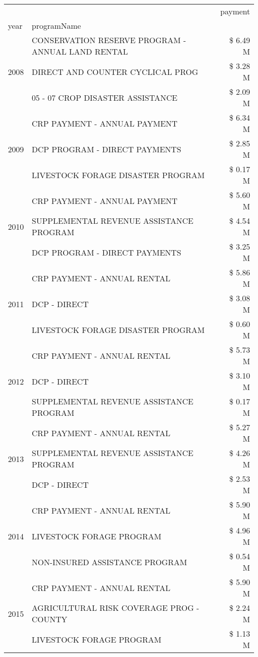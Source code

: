 \begin{tabular}{llr}
\toprule
 &  & payment \\
year & programName &  \\
\midrule
\multirow[t]{3}{*}{2008} & CONSERVATION RESERVE PROGRAM - ANNUAL LAND RENTAL & \$ 6.49 M \\
 & DIRECT AND COUNTER CYCLICAL PROG & \$ 3.28 M \\
 & 05 - 07 CROP DISASTER ASSISTANCE & \$ 2.09 M \\
\cline{1-3}
\multirow[t]{3}{*}{2009} & CRP PAYMENT - ANNUAL PAYMENT & \$ 6.34 M \\
 & DCP PROGRAM - DIRECT PAYMENTS & \$ 2.85 M \\
 & LIVESTOCK FORAGE DISASTER  PROGRAM & \$ 0.17 M \\
\cline{1-3}
\multirow[t]{3}{*}{2010} & CRP PAYMENT - ANNUAL PAYMENT & \$ 5.60 M \\
 & SUPPLEMENTAL REVENUE ASSISTANCE PROGRAM & \$ 4.54 M \\
 & DCP PROGRAM - DIRECT PAYMENTS & \$ 3.25 M \\
\cline{1-3}
\multirow[t]{3}{*}{2011} & CRP PAYMENT - ANNUAL RENTAL & \$ 5.86 M \\
 & DCP - DIRECT & \$ 3.08 M \\
 & LIVESTOCK FORAGE DISASTER PROGRAM & \$ 0.60 M \\
\cline{1-3}
\multirow[t]{3}{*}{2012} & CRP PAYMENT - ANNUAL RENTAL & \$ 5.73 M \\
 & DCP - DIRECT & \$ 3.10 M \\
 & SUPPLEMENTAL REVENUE ASSISTANCE PROGRAM & \$ 0.17 M \\
\cline{1-3}
\multirow[t]{3}{*}{2013} & CRP PAYMENT - ANNUAL RENTAL & \$ 5.27 M \\
 & SUPPLEMENTAL REVENUE ASSISTANCE PROGRAM & \$ 4.26 M \\
 & DCP - DIRECT & \$ 2.53 M \\
\cline{1-3}
\multirow[t]{3}{*}{2014} & CRP PAYMENT - ANNUAL RENTAL & \$ 5.90 M \\
 & LIVESTOCK FORAGE PROGRAM & \$ 4.96 M \\
 & NON-INSURED ASSISTANCE PROGRAM & \$ 0.54 M \\
\cline{1-3}
\multirow[t]{3}{*}{2015} & CRP PAYMENT - ANNUAL RENTAL & \$ 5.90 M \\
 & AGRICULTURAL RISK COVERAGE PROG - COUNTY & \$ 2.24 M \\
 & LIVESTOCK FORAGE PROGRAM & \$ 1.13 M \\
\cline{1-3}

\end{tabular}

